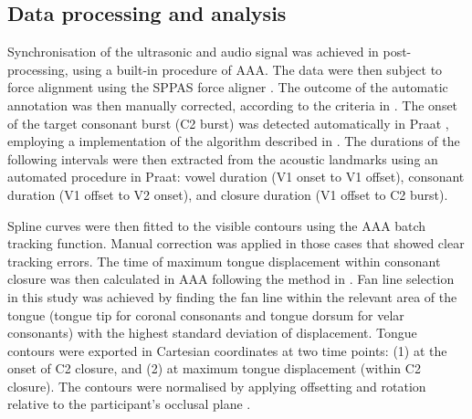 \documentclass[authoryear, twocolumn]{elsarticle}
\begin{document}
\subsection{Data processing and
analysis}\label{data-processing-and-analysis}

Synchronisation of the ultrasonic and audio signal was achieved in
post-processing, using a built-in procedure of AAA. The data were then
subject to force alignment using the SPPAS force aligner
\citep{bigi2015}. The outcome of the automatic annotation was then
manually corrected, according to the criteria in .
The onset of the target consonant burst (C2 burst) was detected
automatically in Praat \citep{boersma2016}, employing a implementation
of the algorithm described in \citet{ananthapadmanabha2014}. The
durations of the following intervals were then extracted from the
acoustic landmarks using an automated procedure in Praat: vowel duration
(V1 onset to V1 offset), consonant duration (V1 offset to V2 onset), and
closure duration (V1 offset to C2 burst).


Spline curves were then fitted to the visible contours using the AAA
batch tracking function. Manual correction was applied in those cases
that showed clear tracking errors. The time of maximum tongue
displacement within consonant closure was then calculated in AAA
following the method in \citet{strycharczuk2015}. Fan line selection in
this study was achieved by finding the fan line within the relevant area
of the tongue (tongue tip for coronal consonants and tongue dorsum for
velar consonants) with the highest standard deviation of displacement.
Tongue contours were exported in Cartesian coordinates at two time
points: (1) at the onset of C2 closure, and (2) at maximum tongue
displacement (within C2 closure). The contours were normalised by
applying offsetting and rotation relative to the participant's occlusal
plane \citep{scobbie2011}.
\end{document}
